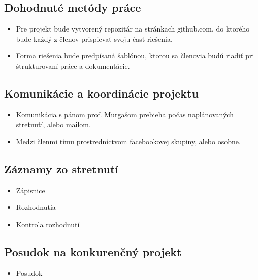     \subsection{Dohodnuté metódy práce}
    	\begin{itemize}
    		\item Pre projekt bude vytvorený repozitár na stránkach github.com, do ktorého bude každý z členov prispievať svoju časť riešenia.
    		\item Forma riešenia bude predpísaná šablónou, ktorou sa členovia budú riadiť pri štrukturovaní práce a dokumentácie.
    	\end{itemize}
    
    \subsection{Komunikácie a koordinácie projektu}
    
    	\begin{itemize}
    		\item Komunikácia s pánom prof. Murgašom prebieha počas naplánovaných stretnutí, alebo mailom.
    		\item Medzi členmi tímu prostredníctvom facebookovej skupiny, alebo osobne. 
    	\end{itemize}
    
    \subsection{Záznamy zo stretnutí}
    \begin{itemize}
    	\item Zápisnice
    	\item Rozhodnutia 
    	\item Kontrola rozhodnutí
    \end{itemize}

    
    \subsection{Posudok na konkurenčný projekt}
    \begin{itemize}
    	\item Posudok
    \end{itemize}


